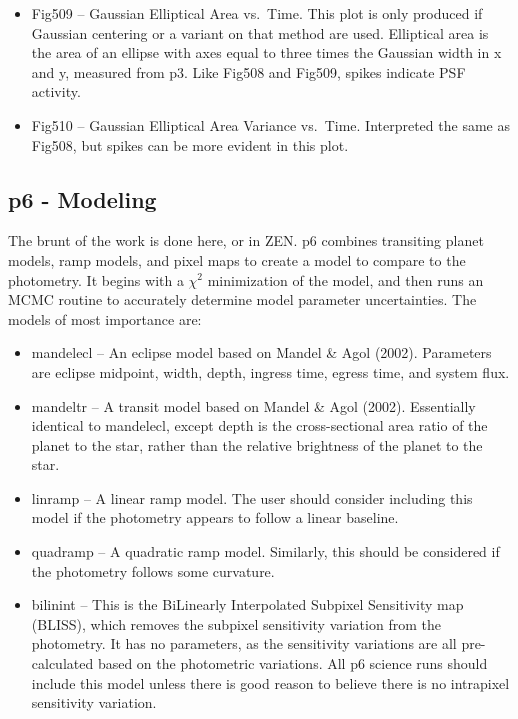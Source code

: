\documentclass[letterpaper,12pt]{article}
\begin{document}
\begin{itemize}
\item Fig509 -- Gaussian Elliptical Area vs.\ Time. This plot is
  only produced if Gaussian centering or a variant on that method
  are used. Elliptical area is the area of an ellipse with axes
  equal to three times the Gaussian width in x and y, measured from
  p3. Like Fig508 and Fig509, spikes indicate PSF activity.

\item Fig510 -- Gaussian Elliptical Area Variance vs.\ Time. Interpreted
  the same as Fig508, but spikes can be more evident in this plot.

\end{itemize}


\subsection{p6 - Modeling}
\label{sec:p6}
The brunt of the work is done here, or in ZEN. p6 combines
transiting planet models, ramp models, and pixel maps to create a
model to compare to the photometry. It begins with a $\chi^2$
minimization of the model, and then runs an MCMC routine to accurately
determine model parameter uncertainties. The models of most importance
are:

\begin{itemize}
\item mandelecl -- An eclipse model based on Mandel \& Agol (2002).
  Parameters are eclipse midpoint, width, depth, ingress time, egress
  time, and system flux.

\item mandeltr -- A transit model based on Mandel \& Agol (2002).
  Essentially identical to mandelecl, except depth is the cross-sectional
  area ratio of the planet to the star, rather than the relative brightness
  of the planet to the star.

\item linramp -- A linear ramp model. The user should consider including
  this model if the photometry appears to follow a linear baseline.

\item quadramp -- A quadratic ramp model. Similarly, this should be
  considered if the photometry follows some curvature.

\item bilinint -- This is the BiLinearly Interpolated Subpixel
  Sensitivity map (BLISS), which removes the subpixel sensitivity
  variation from the photometry. It has no parameters, as the
  sensitivity variations are all pre-calculated based on the
  photometric variations. All p6 science runs should include this
  model unless there is good reason to believe there is no intrapixel
  sensitivity variation.
\end{itemize}
\end{document}
